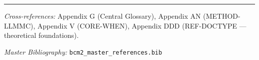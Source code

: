 
\vspace{1em}
\hrule
\vspace{0.5em}

\noindent\textit{Cross-references:}
Appendix G (Central Glossary),
Appendix AN (METHOD-LLMMC),
Appendix V (CORE-WHEN),
Appendix DDD (REF-DOCTYPE --- theoretical foundations).

\noindent\textit{Master Bibliography:} \texttt{bcm2\_master\_references.bib}


